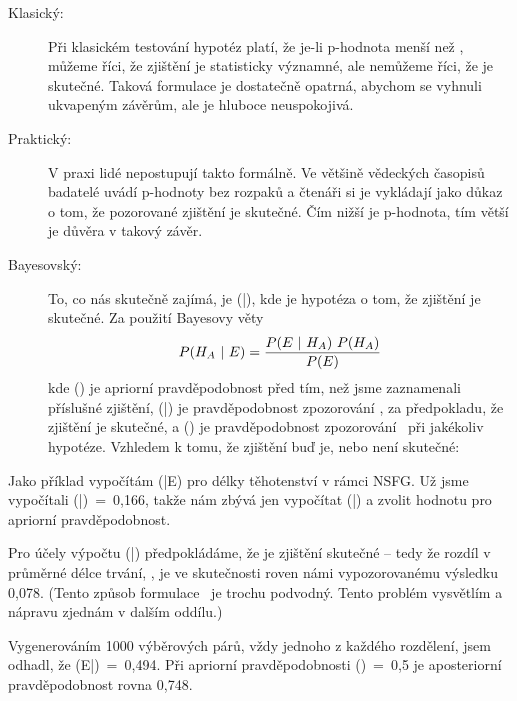 \documentclass[12pt]{book}
\begin{document}
\begin{description}

\item[Klasický:] Při klasickém testování hypotéz platí, že je-li p-hodnota menší než \myalpha,
můžeme říci, že zjištění je statisticky významné, ale nemůžeme říci, že je skutečné.   Taková formulace je dostatečně opatrná, abychom se vyhnuli ukvapeným závěrům, ale je hluboce neuspokojivá.

\item[Praktický:] V praxi lidé nepostupují takto formálně. Ve většině vědeckých časopisů badatelé uvádí p-hodnoty bez rozpaků a čtenáři si je vykládají jako důkaz o tom, že pozorované zjištění je skutečné. Čím nižší je p-hodnota, tím větší je důvěra v takový závěr.

\item[Bayesovský:] To, co nás skutečně zajímá, je \Prob(\HH{}|\E),
 kde \HH{} je hypotéza o tom, že zjištění je skutečné.
  Za použití Bayesovy věty
  \[ P(H_A ~|~ E) = \frac{P(E ~|~ H_A) ~ P(H_A)}{P(E)} \]
  kde \Prob(\HH{}) je apriorní pravděpodobnost \HH{} před tím, než jsme zaznamenali příslušné zjištění, \Prob(\E|\HH{}) je pravděpodobnost zpozorování \E,
  za předpokladu, že zjištění je skutečné, a \Prob(\E) je pravděpodobnost zpozorování \E~při jakékoliv hypotéze. Vzhledem k tomu, že zjištění buď je, nebo není skutečné:


\end{description}

Jako příklad vypočítám \Prob(\HH{}|E) pro délky těhotenství v rámci NSFG.  Už jsme vypočítali
\Prob(\E|\HH{})~=~0,166, takže nám zbývá jen vypočítat
\Prob(\E|\HH{}) a zvolit hodnotu pro apriorní pravděpodobnost.

Pro účely výpočtu \Prob(\E|\HH{}) předpokládáme, že je zjištění skutečné
-- tedy že rozdíl v průměrné délce trvání, \mydelta, je ve skutečnosti roven námi vypozorovanému výsledku
0,078.  (Tento způsob formulace \HH{}~je trochu podvodný.
Tento problém vysvětlím a nápravu zjednám v dalším oddílu.)

Vygenerováním 1000 výběrových párů, vždy jednoho z každého rozdělení, jsem odhadl, že
\Prob(E|\HH{})~=~0,494.  Při apriorní pravděpodobnosti
\Prob(\HH{})~=~0,5 je aposteriorní pravděpodobnost \HH{} rovna 0,748.
\end{document}
